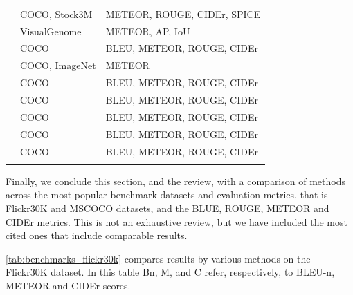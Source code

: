 \begin{longtable}{ p{} p{} p{} }
    \citet{Wang2017} & COCO, Stock3M & METEOR, ROUGE, CIDEr, SPICE \\
    \citet{Yang2017} & VisualGenome & METEOR, AP, IoU \\
    \citet{Yao2017_Attr} & COCO & BLEU, METEOR, ROUGE, CIDEr \\
    \citet{Yao2017_NOB} & COCO, ImageNet & METEOR \\
    \citet{Zhang2017} & COCO & BLEU, METEOR, ROUGE, CIDEr \\
    \citet{Aneja2018} & COCO & BLEU, METEOR, ROUGE, CIDEr \\
    \citet{Jiang2018} & COCO & BLEU, METEOR, ROUGE, CIDEr\\
    \citet{Khademi2018} & COCO & BLEU, METEOR, ROUGE, CIDEr\\
    \citet{Wang2018} & COCO & BLEU, METEOR, ROUGE, CIDEr \\
    \bottomrule
\label{tab:nn_methods_datasets_metrics}
\end{longtable}

Finally, we conclude this section, and the review, with a  comparison of methods across the most popular benchmark datasets and evaluation metrics, that is Flickr30K and MSCOCO datasets, and the BLUE, ROUGE, METEOR and CIDEr metrics. This is not an exhaustive review, but we have included the most cited ones that include comparable results.

\cref{tab:benchmarks_flickr30k} compares results by various methods on the Flickr30K dataset. In this table Bn, M, and C refer, respectively, to BLEU-n, METEOR and CIDEr scores.

